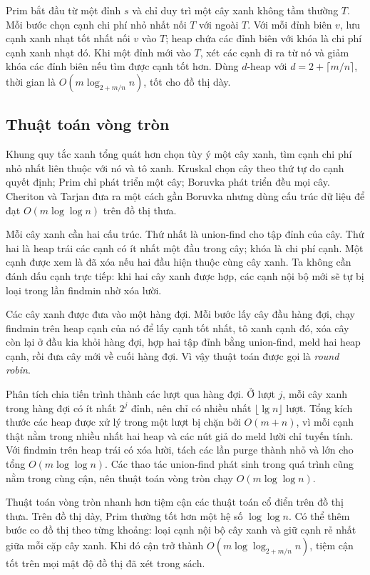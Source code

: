 \documentclass[11pt]{article}
\begin{document}
Prim bắt đầu từ một đỉnh \(s\) và chỉ duy trì một cây xanh không tầm thường
\(T\). Mỗi bước chọn cạnh chi phí nhỏ nhất nối \(T\) với ngoài \(T\). Với mỗi
đỉnh biên \(v\), lưu cạnh xanh nhạt tốt nhất nối \(v\) vào \(T\); heap chứa các
đỉnh biên với khóa là chi phí cạnh xanh nhạt đó. Khi một đỉnh mới vào \(T\), xét
các cạnh đi ra từ nó và giảm khóa các đỉnh biên nếu tìm được cạnh tốt hơn. Dùng
\(d\)-heap với \(d=2+\lceil m/n\rceil\), thời gian là
\(O(m\log_{2+m/n} n)\), tốt cho đồ thị dày.

\subsection*{Thuật toán vòng tròn}

Khung quy tắc xanh tổng quát hơn chọn tùy ý một cây xanh, tìm cạnh chi phí nhỏ
nhất liên thuộc với nó và tô xanh. Kruskal chọn cây theo thứ tự do cạnh quyết
định; Prim chỉ phát triển một cây; Boruvka phát triển đều mọi cây. Cheriton và
Tarjan đưa ra một cách gần Boruvka nhưng dùng cấu trúc dữ liệu để đạt
\(O(m\log\log n)\) trên đồ thị thưa.

Mỗi cây xanh cần hai cấu trúc. Thứ nhất là union-find cho tập đỉnh của cây.
Thứ hai là heap trái các cạnh có ít nhất một đầu trong cây; khóa là chi phí cạnh.
Một cạnh được xem là đã xóa nếu hai đầu hiện thuộc cùng cây xanh. Ta không cần
đánh dấu cạnh trực tiếp: khi hai cây xanh được hợp, các cạnh nội bộ mới sẽ tự bị
loại trong lần findmin nhờ xóa lười.

Các cây xanh được đưa vào một hàng đợi. Mỗi bước lấy cây đầu hàng đợi, chạy
findmin trên heap cạnh của nó để lấy cạnh tốt nhất, tô xanh cạnh đó, xóa cây còn
lại ở đầu kia khỏi hàng đợi, hợp hai tập đỉnh bằng union-find, meld hai heap
cạnh, rồi đưa cây mới về cuối hàng đợi. Vì vậy thuật toán được gọi là
\emph{round robin}.

Phân tích chia tiến trình thành các lượt qua hàng đợi. Ở lượt \(j\), mỗi cây
xanh trong hàng đợi có ít nhất \(2^j\) đỉnh, nên chỉ có nhiều nhất
\(\lfloor\lg n\rfloor\) lượt. Tổng kích thước các heap được xử lý trong một lượt
bị chặn bởi \(O(m+n)\), vì mỗi cạnh thật nằm trong nhiều nhất hai heap và các
nút giả do meld lười chỉ tuyến tính. Với findmin trên heap trái có xóa lười, tách
các lần purge thành nhỏ và lớn cho tổng \(O(m\log\log n)\). Các thao tác
union-find phát sinh trong quá trình cũng nằm trong cùng cận, nên thuật toán
vòng tròn chạy \(O(m\log\log n)\).

Thuật toán vòng tròn nhanh hơn tiệm cận các thuật toán cổ điển trên đồ thị
thưa. Trên đồ thị dày, Prim thường tốt hơn một hệ số \(\log\log n\). Có thể thêm
bước co đồ thị theo từng khoảng: loại cạnh nội bộ cây xanh và giữ cạnh rẻ nhất
giữa mỗi cặp cây xanh. Khi đó cận trở thành \(O(m\log\log_{2+m/n} n)\), tiệm cận
tốt trên mọi mật độ đồ thị đã xét trong sách.
\end{document}
